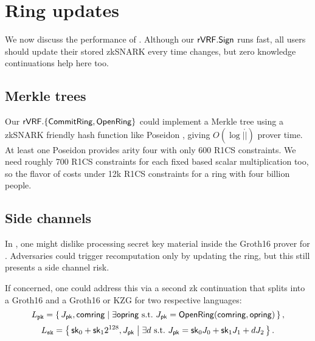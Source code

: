 \section{Ring updates}
\label{sec:ring_updates}


We now discuss the performance of \pifast.
Although our ${\mathsf{rVRF}}.{\mathsf{Sign}}$ runs fast, all users should update their
stored zkSNARK \pifast every time \ring changes, %
but zero knowledge continuations help here too.


\subsection{Merkle trees} %

Our ${\mathsf{rVRF}}.\{ {\mathsf{CommitRing}}, {\mathsf{OpenRing}} \}$ could implement a Merkle tree
using a zkSNARK friendly hash function like Poseidon \cite{poseidon},
giving $O(\log |\ring|)$ prover time.
%
At least one Poseidon \cite{poseidon} provides arity four with only
600 R1CS constraints.  We need roughly 700 R1CS constraints for each
fixed based scalar multiplication too, so the flavor of \pifast costs
under 12k R1CS constraints for a ring with four billion people.



\subsection{Side channels}
\label{subsec:rvrf_side_channel}

In \pifast, one might dislike processing secret key material inside
the Groth16 prover for \pifast.
Adversaries could trigger \pifast recomputation only by updating the ring,
but this still presents a side channel risk.

If concerned, one could address this via a second zk continuation that
splits \pifast into a Groth16 \pisk and a Groth16 or KZG \pipk for two
respective languages:
%
$$ \Lpk = \Setst{ J_\pk, \comring }{
	\exists \openring \textrm{\ s.t.\ }
	J_\pk = \eprint{\rVRF.}{}\OpenRing(\comring,\openring)
} \mathcomma \eprint{\quad\textrm{and}}{} $$ 
%
$$ \Lsk = \Setst{ \sk_0 + \sk_1 2^{128}, J_\pk }{ 
	\exists d \textrm{\ s.t.\ }
	J_\pk = \sk_0 \genJ_0 + \sk_1 \genJ_1 + d \genJ_2
} \mathperiod $$

